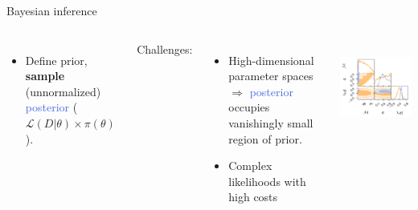 \documentclass[aspectratio=169, 11pt]{beamer}
\begin{document}
\begin{frame}{Bayesian inference}
\begin{columns}
    
\begin{itemize}
    \item Define \textcolor{BurntOrange}{prior}, \textbf{sample} (unnormalized) \textcolor{RoyalBlue}{posterior} ($\mathcal{L}(D | \theta) \times \pi(\theta)$).
\end{itemize}
\vspace{2em}
\raggedright
Challenges:\vfill
    \begin{itemize}
        \item High-dimensional parameter spaces $\Rightarrow$ \textcolor{RoyalBlue}{posterior} occupies vanishingly small region of \textcolor{BurntOrange}{prior}.
        \item Complex likelihoods with high costs
    \end{itemize}
    \vfill 

\
\vspace{-2em}
\centering
\includegraphics[]{Ca_Foscari Beamer/presentation_triangleplot.pdf}
\end{columns}
\end{frame}


    
\end{document}
